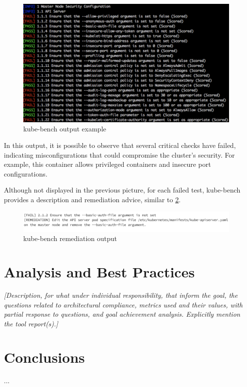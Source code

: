 \documentclass[a4paper,11pt,openright,BCOR=15mm]{scrbook}
\begin{document}
\begin{figure}[h!]
	\centering
	\label{fig:kubeBenchOutput}
	\includegraphics[scale=0.5]{figs/kube-bench-output.png}
	\caption{kube-bench output example \cite{noauthor_kube_bench_nodate}}
\end{figure}

In this output, it is possible to observe that several critical checks have failed, indicating misconfigurations that could compromise the cluster's security. For example, this container allows privileged containers and insecure port configurations.

Although not displayed in the previous picture, for each failed test, kube-bench provides a description and remediation advice, similar to \ref{fig:kubeBenchRemediation}.

\begin{figure}[h!]
	\centering
	\label{fig:kubeBenchRemediation}
	\includegraphics[scale=0.45]{figs/kube-bench-remediation.png}
	\caption{kube-bench remediation output \cite{benhassan_depth_2024}}
\end{figure}

	\chapter{Analysis and Best Practices}
 \textit{	[Description, for what under individual responsibility, that inform the goal, the questions related to architectural compliance, metrics used and their values, with partial response to questions, and goal achievement analysis. Explicitly mention the tool report(s).]}
	


	\chapter{Conclusions }
 ...\newline



%	
%	
%	
	
	\printbibliography[heading=bibintoc]
	
	
\end{document}
